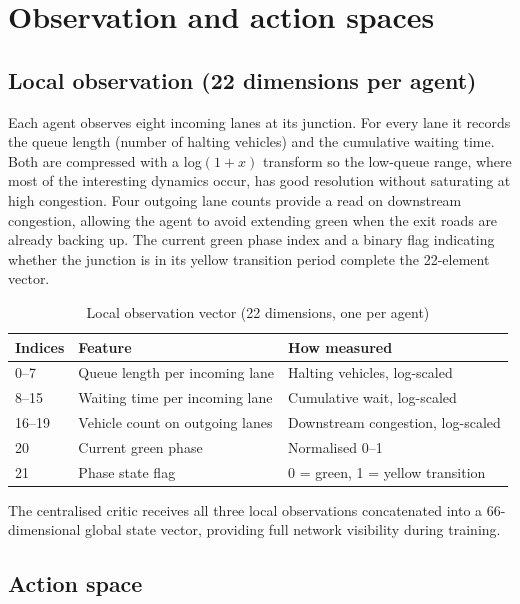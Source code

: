 \documentclass[11pt, a4paper]{report}
\begin{document}
\section{Observation and action spaces}

\subsection{Local observation (22 dimensions per agent)}

Each agent observes eight incoming lanes at its junction. For every lane it records the queue length (number of halting vehicles) and the cumulative waiting time. Both are compressed with a log$(1+x)$ transform so the low-queue range, where most of the interesting dynamics occur, has good resolution without saturating at high congestion. Four outgoing lane counts provide a read on downstream congestion, allowing the agent to avoid extending green when the exit roads are already backing up. The current green phase index and a binary flag indicating whether the junction is in its yellow transition period complete the 22-element vector.

\begin{table}[H]
\centering
\caption{Local observation vector (22 dimensions, one per agent)}
\label{tab:obs_space}
\begin{tabular}{lll}
\toprule
\textbf{Indices} & \textbf{Feature} & \textbf{How measured} \\
\midrule
0--7  & Queue length per incoming lane & Halting vehicles, log-scaled \\
8--15 & Waiting time per incoming lane & Cumulative wait, log-scaled \\
16--19 & Vehicle count on outgoing lanes & Downstream congestion, log-scaled \\
20 & Current green phase & Normalised 0--1 \\
21 & Phase state flag & 0 = green, 1 = yellow transition \\
\bottomrule
\end{tabular}
\end{table}

The centralised critic receives all three local observations concatenated into a 66-dimensional global state vector, providing full network visibility during training.

\subsection{Action space}
\end{document}
